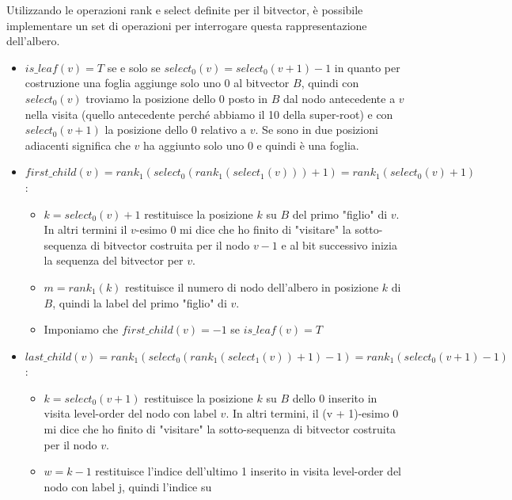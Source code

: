 Utilizzando le operazioni rank e select definite per il bitvector, è possibile
implementare un set di operazioni per interrogare questa rappresentazione
dell'albero.
\begin{itemize}
    \item $is\_leaf(v) = T$ se e solo se $select_0(v) = select_0(v + 1) - 1$ in
          quanto per costruzione una foglia aggiunge solo uno 0 al bitvector $B$,
          quindi con $select_0(v)$ troviamo la posizione dello 0 posto in $B$ dal
          nodo antecedente a $v$ nella visita (quello antecedente perché abbiamo
          il 10 della super-root) e con $select_0(v + 1)$ la posizione dello 0
          relativo a $v$. Se sono in due posizioni adiacenti significa che $v$ ha
          aggiunto solo uno $0$ e quindi è una foglia.
    \item $first\_child(v) = rank_1(select_0(rank_1(select_1(v)))+1) = rank_1
              (select_0(v)+1)$:
          \begin{itemize}
              \item $k = select_0(v) + 1$ restituisce la posizione $k$ su $B$ del
                    primo "figlio" di $v$. In altri termini il $v$-esimo 0 mi
                    dice che ho finito di "visitare" la sotto-sequenza di bitvector
                    costruita per il nodo $v - 1$ e al bit successivo inizia la
                    sequenza del bitvector per $v$.
              \item $m = rank_1(k)$ restituisce il numero di nodo dell'albero in
                    posizione $k$ di $B$, quindi la label del primo "figlio" di
                    $v$.
              \item Imponiamo che $first\_child(v) = - 1$ se $is\_leaf (v) = T$
          \end{itemize}
    \item $last\_child(v) = rank_1(select_0(rank_1(select_1(v))+1)-1) = rank_1
              (select_0(v+1)-1)$:
          \begin{itemize}
              \item $k = select_0(v + 1)$ restituisce la posizione $k$ su $B$
                    dello $0$ inserito in visita level-order del nodo con label
                    $v$. In altri termini, il (v + 1)-esimo 0 mi dice che ho
                    finito di "visitare" la sotto-sequenza di bitvector costruita
                    per il nodo $v$.
              \item $w = k - 1$ restituisce l'indice dell'ultimo 1 inserito in
                    visita level-order del nodo con label j, quindi l'indice su

\end{itemize}
\end{itemize}
